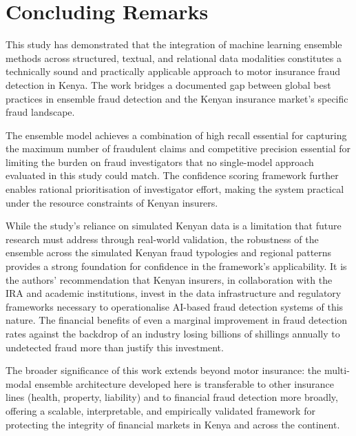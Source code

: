 \documentclass[12pt,a4paper,oneside]{report}
\numberwithin{equation}{chapter}
\begin{document}
\section{Concluding Remarks}

This study has demonstrated that the integration of machine learning ensemble methods across
structured, textual, and relational data modalities constitutes a technically sound and
practically applicable approach to motor insurance fraud detection in Kenya. The work bridges a
documented gap between global best practices in ensemble fraud detection and the Kenyan insurance
market's specific fraud landscape.

The ensemble model achieves a combination of high recall essential for capturing the maximum
number of fraudulent claims and competitive precision essential for limiting the burden on
fraud investigators that no single-model approach evaluated in this study could match. The
confidence scoring framework further enables rational prioritisation of investigator effort,
making the system practical under the resource constraints of Kenyan insurers.

While the study's reliance on simulated Kenyan data is a limitation that future research must
address through real-world validation, the robustness of the ensemble across the simulated Kenyan
fraud typologies and regional patterns provides a strong foundation for confidence in the
framework's applicability. It is the authors' recommendation that Kenyan insurers, in collaboration
with the IRA and academic institutions, invest in the data infrastructure and regulatory frameworks
necessary to operationalise AI-based fraud detection systems of this nature. The financial benefits
of even a marginal improvement in fraud detection rates against the backdrop of an industry
losing billions of shillings annually to undetected fraud more than justify this investment.

The broader significance of this work extends beyond motor insurance: the multi-modal ensemble
architecture developed here is transferable to other insurance lines (health, property, liability)
and to financial fraud detection more broadly, offering a scalable, interpretable, and empirically
validated framework for protecting the integrity of financial markets in Kenya and across the
continent.



\end{document}
